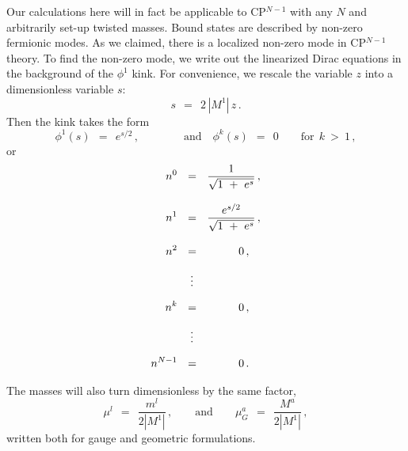 \documentclass[epsfig,12pt]{article}
\def\beq{\begin{equation}}
\def\eeq{\end{equation}}
\def\beq{\begin{equation}}
\def\eeq{\end{equation}}
\begin{document}
	Our calculations here will in fact be applicable to CP$^{N-1}$ with any $ N $ 
	and arbitrarily set-up twisted masses.
	Bound states are described by non-zero fermionic modes. 
	As we claimed, there is a localized non-zero mode in CP$^{N-1}$ theory.
	To find the non-zero mode, we write out the linearized Dirac equations in the background
	of the $ \phi^1 $ kink.
	For convenience, we rescale the variable $ z $ into a dimensionless variable $ s $:
\beq
	s ~~=~~ 2\, |M^1|\, z\,.
\eeq
	Then the kink takes the form
\beq
	\phi^1(s) ~~=~~ e^{s/2}\,,\qquad\qquad\text{and}\quad \phi^k(s) ~~=~~ 0 \qquad \text{for}~~ k ~>~ 1\,,
\eeq
	or
\begin{align}
%
\notag
	n^0  & ~~=~~ \frac {             1              }
                           {    \sqrt{ 1 ~+~ e^s }      }\,, \\[3mm]
%
\notag
	n^1  & ~~=~~ \frac {          e^{s/2}           }
                           {    \sqrt{ 1 ~+~ e^s }      }\,, \\[3mm]
%
\notag
	n^2  & ~~=~~ \qquad~~\, 0\,,  \\[2mm]
%	 
 	     & ~~~\,\vdots          \\[2mm]
%
\notag
	n^k  & ~~=~~ \qquad~~\, 0\,,  \\[2mm]
%	 
\notag
 	     & ~~~\,\vdots          \\[2mm]
%
\notag
	n^{N-1} & ~~=~~ \qquad~~\, 0\,.                
\end{align}

	The masses will also turn dimensionless by the same factor,
\beq
	\mu^l  ~~=~~ \frac{ m^l }
                        {2 |M^1|}\,,
	 \qquad
	 \text{and}
	 \qquad
	 \mu_G^a ~~=~~ \frac{ M^a }
                           {2 |M^1|}\,,
\eeq
	written both for gauge and geometric formulations.
\end{document}
